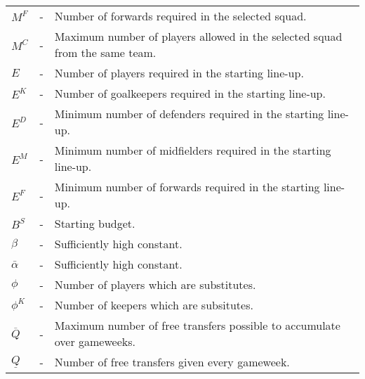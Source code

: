 \begin{table}[H]
\begin{tabular}{@{}lll@{}}
$M^{F}$                          & - & Number of forwards required in the selected squad.                                              \\
$M^{C}$                          & - & Maximum number of players allowed in the selected squad from the same team.                                         \\
$E$                              & - & Number of players required in the starting line-up.                                               \\
$E^{K}$                          & - & Number of goalkeepers required in the starting line-up.                                           \\
$E^{D}$                          & - & Minimum number of defenders required in the starting line-up.                                     \\
$E^{M}$                          & - & Minimum number of midfielders required in the starting line-up.                                   \\
$E^{F}$                          & - & Minimum number of forwards required in the starting line-up.                                      \\
$B^{S}$                          & - & Starting budget.                                                                               \\
$\beta$                          & - & Sufficiently high constant.                                                                                  \\          
$\bar{\alpha}$                   & - & Sufficiently high constant.                                                                      \\

$\phi$                         & - & Number of players which are substitutes.                                                         \\
$\phi^{K}$                   & - & Number of keepers which are subsitutes.                                                          \\
$\overline{Q}$                   & - & Maximum number of free transfers possible to accumulate over gameweeks.                        \\
$\underline{Q}$                  & - & Number of free transfers given every gameweek.                                                 \\ \bottomrule
\end{tabular}
\end{table}


